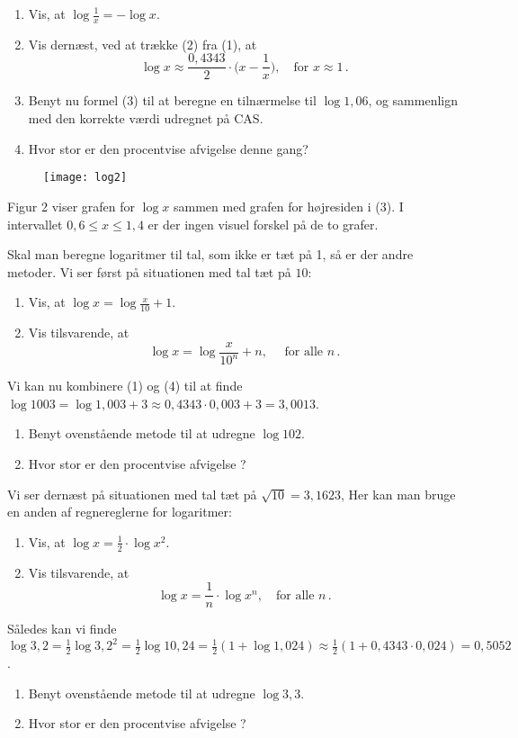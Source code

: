\documentclass[12pt,oneside,a4paper]{article}
\theoremstyle{plain}
\begin{document}
\begin{enumerate}[label=(\alph*), resume]
    \item Vis, at $\log\frac1x = -\log x$.
    \item Vis dernæst, ved at trække (2) fra (1), at 
        \[
            \tag{3}
            \log x \approx \frac{0,4343}{2} \cdot \Big(x-\frac1x\Big),\quad
            \mbox{for $x\approx 1$}\,.
            \]
    \item Benyt nu formel (3) til at beregne en tilnærmelse til $\log
        1,06$, og sammenlign med den korrekte værdi udregnet på CAS.
    \item Hvor stor er den procentvise afvigelse denne gang?
\end{enumerate}

\begin{figure}[H]
    \centering
    \texttt{[image: log2]}
    \label{log2}
\end{figure}
Figur 2 viser grafen for $\log x$ sammen med grafen for højresiden i (3).  I
intervallet $0,6\le x \le 1,4$ er der ingen visuel forskel på de to grafer.

Skal man beregne logaritmer til tal, som ikke er tæt på 1, så er der andre metoder.
Vi ser først på situationen med tal tæt på $10$:

\begin{enumerate}[label=(\alph*), resume]
    \item Vis, at $\log x = \log\frac{x}{10} + 1$.
    \item Vis tilsvarende, at 
        \[
            \tag{4}
            \log x = \log\frac{x}{10^n} + n,\quad\mbox{ for alle $n$}\,.
        \]

\end{enumerate}
Vi kan nu kombinere (1) og (4) til at finde $\log 1003 = \log 1,003 + 3
\approx 0,4343\cdot 0,003 + 3 = 3,0013$.
\begin{enumerate}[label=(\alph*), resume]
    \item Benyt ovenstående metode til at udregne $\log 102$.
    \item Hvor stor er den procentvise afvigelse ?
\end{enumerate}

Vi ser dernæst på situationen med tal tæt på $\sqrt{10} = 3,1623$, Her kan man
bruge en anden af regnereglerne for logaritmer:
\begin{enumerate}[label=(\alph*), resume]
    \item Vis, at $\log x = \frac12 \cdot \log x^2$.
    \item Vis tilsvarende, at
        \[
            \tag{5}
            \log x = \frac1n \cdot \log x^n,\quad \mbox{for alle $n$}\,.
        \]
\end{enumerate}
Således kan vi finde $\log 3,2 = \frac12 \log 3,2^2 = \frac12 \log 10,24
 = \frac12 (1 + \log 1,024) \approx \frac12 (1 + 0,4343\cdot 0,024)
 = 0,5052$.
\begin{enumerate}[label=(\alph*), resume]
    \item Benyt ovenstående metode til at udregne $\log 3,3$.
    \item Hvor stor er den procentvise afvigelse ?
\end{enumerate}
\end{document}
